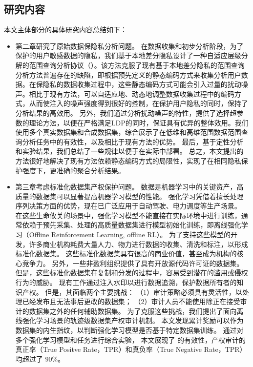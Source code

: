 \subsection{研究内容}
本文主体部分的具体研究内容总结如下：
\begin{itemize}
    \item 第二章研究了原始数据保隐私分析问题。
    在数据收集和初步分析阶段，为了保护的用户敏感数据的隐私，我们基于本地差分隐私设计了一种自适应层级分解的范围查询分析协议（\myahead ）。该方法克服了现有基于本地差分隐私的范围查询分析方法普遍存在的缺陷，即根据预先定义的静态编码方式来收集分析用户数据。在保隐私的数据收集过程中，这些静态编码方式可能会引入过量的扰动噪声。相比于现有方法，\myahead 可以自适应地、动态地调整数据收集过程中的编码方式，从而使注入的噪声强度得到很好的控制，在保护用户隐私的同时，保持了分析结果的高效用。
    另外，我们通过分析扰动噪声的特性，提供了选择\myahead 超参数的理论方法，以便在严格满足LDP的同时，保证\myahead 具有优异的整体效用。我们使用多个真实数据集和合成数据集，综合展示了\myahead 在低维和高维范围数据范围查询分析任务中的有效性，以及相比于现有方法的优势。
    最后，基于定性分析和实验结果，我们总结了一些规律以便于在实际中部署\myahead 。
    总之，本文提出的方法很好地解决了现有方法依赖静态编码方式的局限性，实现了在相同隐私保护强度下，更准确的聚合分析结果。
    \item 第三章考虑标准化数据集产权保护问题。
    数据是机器学习中的关键资产，高质量的数据集可以显著提高机器学习模型的性能。
    强化学习凭借着擅长处理序列决策方面的优势，现在已广泛应用于自动驾驶、电力调度等生产场景。
    在这些生命攸关的场景中，强化学习模型不能直接在实际环境中进行训练，通常依赖于预先采集、处理的高质量数据集进行模型初始化训练，即离线强化学习（Offline Reinforcement Learning, offline RL）。
    为了支持这些模型的开发，许多商业机构耗费大量人力、物力进行数据的收集、清洗和标注，以形成标准化数据集。
    这些标准化数据集具有很高的商业价值，甚至成为机构的核心竞争力。
    另外，一些非盈利组织提供了具有开放源代码许可证的数据集。
    但是，这些标准化数据集在复制和分发的过程中，容易受到潜在的滥用或侵权行为的威胁。
    现有工作通过注入水印以进行数据追溯，保护数据所有者的知识产权。
    但是，其面临两个主要挑战：
    （1）审计策略必须具有灵活性，以处理已经发布且无法事后更改的数据集；
    （2）审计人员不能使用除正在接受审计的数据集之外的任何辅助数据集。
    为了克服这些挑战，我们提出了面向离线强化学习场景的轨迹级数据集产权审计机制\sysnameo 。
    本文发现累计奖励可以作为数据集的内生指纹，以判断强化学习模型是否基于特定数据集训练。
    通过对多个强化学习模型和任务进行综合实验，
    本文展现了 \sysnameo 的有效性，产权审计的真正率（True Positve Rate，TPR）和真负率（True Negative Rate，TPR）均超过了 $90\%$。

\end{itemize}
